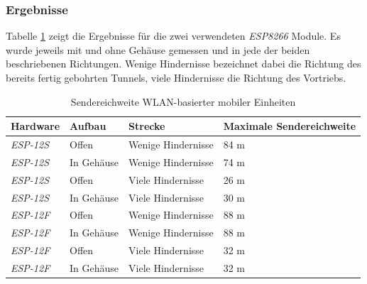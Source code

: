 \subsubsection{Ergebnisse}
Tabelle \ref{table:rangewifi} zeigt die Ergebnisse für die zwei verwendeten \emph{ESP8266} Module.
Es wurde jeweils mit und ohne Gehäuse gemessen und in jede der beiden beschriebenen Richtungen.
Wenige Hindernisse bezeichnet dabei die Richtung des bereits fertig gebohrten Tunnels, viele Hindernisse die Richtung des Vortriebs.

\begin{table}[h]
	\centering
	\caption{Sendereichweite WLAN-basierter mobiler Einheiten}
	\label{table:rangewifi}
	\begin{tabular}{l|l|l|l}
		Hardware & Aufbau & Strecke & Maximale Sendereichweite \\
		\hline
		\emph{ESP-12S} & Offen & Wenige Hindernisse & 84 m \\
		\emph{ESP-12S} & In Gehäuse & Wenige Hindernisse & 74 m \\
		\emph{ESP-12S} & Offen & Viele Hindernisse & 26 m \\
		\emph{ESP-12S} & In Gehäuse & Viele Hindernisse & 30 m \\
		\hline
		\emph{ESP-12F} & Offen & Wenige Hindernisse & 88 m \\
		\emph{ESP-12F} & In Gehäuse & Wenige Hindernisse & 88 m \\
		\emph{ESP-12F} & Offen & Viele Hindernisse & 32 m \\
		\emph{ESP-12F} & In Gehäuse & Viele Hindernisse & 32 m \\
	\end{tabular}
\end{table}


